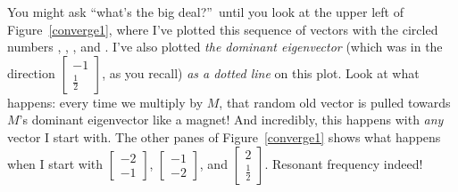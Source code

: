 You might ask ``what's the big deal?''~until you look at the upper left of
Figure~\ref{converge1}, where I've plotted this sequence of vectors with the
circled numbers , , , and . I've also
plotted \textit{the dominant eigenvector} (which was in the direction
{\footnotesize $\begin{bmatrix} -1 \\ \frac{1}{2} \end{bmatrix}$}, as you
recall) \textit{as a dotted line} on this plot. Look at what happens: every
time we multiply by $M$, that random old vector is pulled towards $M$'s
dominant eigenvector like a magnet! And incredibly, this happens with
\textit{any} vector I start with. The other panes of Figure~\ref{converge1}
shows what happens when I start with {\footnotesize $\begin{bmatrix} -2 \\ -1
\end{bmatrix}$}, {\footnotesize $\begin{bmatrix} -1 \\ -2 \end{bmatrix}$}, and
{\footnotesize $\begin{bmatrix} 2 \\ \frac{1}{2} \end{bmatrix}$}. Resonant
frequency indeed!

\label{magneticPull}

